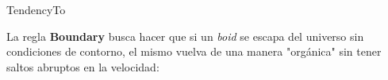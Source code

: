 \documentclass[a4paper]{article}
\begin{document}
                \begin{algorithm}
                    \caption{TendencyTo}\label{pseudo:tendency_to}
                    \begin{algorithmic}[1]
                    \EndProcedure
                    \end{algorithmic}
                \end{algorithm}

                La regla \textbf{Boundary} busca hacer que si un \textit{boid} se escapa del universo sin condiciones de contorno, el mismo vuelva de una manera "orgánica" sin tener saltos abruptos en la velocidad:

                \pagebreak
\end{document}
